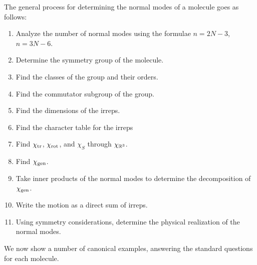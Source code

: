 \documentclass[11pt]{article}
\begin{document}
The general process for determining the normal modes of a molecule
goes as follows:
\begin{enumerate}
    \item Analyze the number of normal modes using the formulae
    $n = 2N - 3$, $n = 3N - 6$. 
    \item Determine the symmetry group of the molecule.
    \item Find the classes of the group and their orders.
    \item Find the commutator subgroup of the group.
    \item Find the dimensions of the irreps.
    \item Find the character table for the irreps
    \item Find $\chi_{\rm tr}$, $\chi_{\rm rot}$, and $\chi_S$
    through $\chi_{\mathbb{R}^3}$.
    \item Find $\chi_{\rm gen}$.
    \item Take inner products of the normal modes to determine
    the decomposition of $\chi_{\rm gen}$.
    \item Write the motion as a direct sum of irreps.
    \item Using symmetry considerations, determine the
    physical realization of the normal modes.
\end{enumerate}

We now show a number of canonical examples, answering the standard
questions for each molecule.
\end{document}
